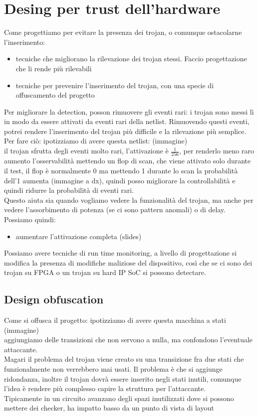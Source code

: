 \documentclass[oneside, 12pt]{extbook}
\begin{document}
\section{Desing per trust dell'hardware}
Come progettiamo per evitare la presenza dei trojan, o comunque ostacolarne l'inserimento:
\begin{itemize}
	\item tecniche che migliorano la rilevazione dei trojan stessi. Faccio progettazione che li rende più rilevabili
	\item tecniche per prevenire l'inserimento del trojan, con una specie di offuscamento del progetto
\end{itemize}
Per migliorare la detection, posson rimuovere gli eventi rari: i trojan sono messi lì in modo da essere attivati da eventi rari della netlist. Rimuovendo questi eventi, potrei rendere l'inserimento del trojan più difficile e la rilevazione più semplice. Per fare ciò: ipotizziamo di avere questa netlist: (immagine)\\il trojan sfrutta degli eventi molto rari, l'attivazione è $\frac{1}{256}$, per renderlo meno raro aumento l'osservabilità mettendo un flop di scan, che viene attivato solo durante il test, il flop è normalmente 0 ma mettendo 1 durante lo scan la probabilità dell'1 aumenta (immagine a dx), quindi posso migliorare la controllabilità e quindi ridurre la probabilità di eventi rari.\\Questo aiuta sia quando vogliamo vedere la funzionalità del trojan, ma anche per vedere l'assorbimento di potenza (se ci sono pattern anomali) o di delay.\\Possiamo quindi:
\begin{itemize}
	\item aumentare l'attivazione completa (slides)
\end{itemize}
Possiamo avere tecniche di run time monitoring, a livello di progettazione si modifica la presenza di modifiche maliziose del dispositivo, così che se ci sono dei trojan su FPGA o un trojan su hard IP SoC si possono detectare.
\subsection{Design obfuscation}
Come si offusca il progetto: ipotizziamo di avere questa macchina a stati (immagine)\\aggiungiamo delle transizioni che non servono a nulla, ma confondono l'eventuale attaccante.\\Magari il problema del trojan viene creato su una transizione fra due stati che funzionalmente non verrebbero mai usati. Il problema è che si aggiunge ridondanza, inoltre il trojan dovrà essere inserito negli stati inutili, comunque l'idea è rendere più complesso capire la struttura per l'attaccante.\\Tipicamente in un circuito avanzano degli spazi inutilizzati dove si possono mettere dei checker, ha impatto basso da un punto di vista di layout
\end{document}
